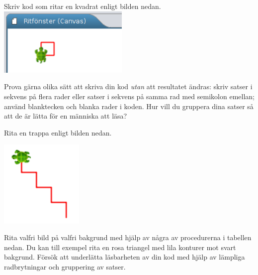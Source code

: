 \Subtask Skriv kod som ritar en kvadrat enligt bilden nedan.
\vspace{1em}\\\includegraphics[width=0.47\textwidth]{../img/kojo/kvadrat}

\noindent Prova gärna olika sätt att skriva din kod \emph{utan} att resultatet ändras: skriv satser i sekvens på flera rader eller satser i sekvens på samma rad med semikolon emellan; använd blanktecken och blanka rader i koden. Hur vill du gruppera dina satser så att de är lätta för en människa att läsa?


\Subtask Rita en trappa enligt bilden nedan.

\includegraphics[width=0.3\textwidth]{../img/kojo/stairs}

\Subtask Rita valfri bild på valfri bakgrund med hjälp av några av procedurerna i tabellen nedan. Du kan till exempel rita en rosa triangel med lila konturer mot svart bakgrund. %
Försök att underlätta läsbarheten av din kod med hjälp av lämpliga radbrytningar och gruppering av satser.


